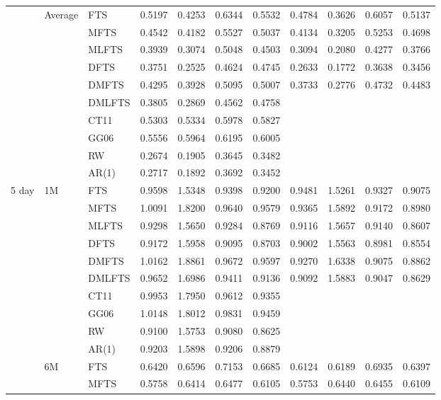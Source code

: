 \documentclass[12pt,a4paper]{article}
\def\textBF#1{\sbox\CBox{#1}\resizebox{\wd\CBox}{\ht\CBox}{\textbf{#1}}}
\begin{document}
\begin{center}
\begin{small}
\begin{longtable}{@{}lllcccccccc@{}}
   \cmidrule{2-11}
   & Average & FTS & 0.5197 & 0.4253 & 0.6344 & 0.5532 & 0.4784 & 0.3626 & 0.6057 & 0.5137 \\ 
  & & MFTS & 0.4542 & 0.4182 & 0.5527 & 0.5037 & 0.4134 & 0.3205 & 0.5253 & 0.4698 \\
  & & MLFTS & 0.3939 & 0.3074 & 0.5048 & 0.4503 & 0.3094 & 0.2080 & 0.4277 & 0.3766\\
  & & DFTS & 0.3751 & 0.2525 & 0.4624 & 0.4745 & 0.2633 & 0.1772 & 0.3638 & 0.3456 \\ 
  & & DMFTS & 0.4295 & 0.3928 & 0.5095 & 0.5007 & 0.3733 & 0.2776 & 0.4732 & 0.4483 \\
  & & DMLFTS & 0.3805 & 0.2869 & 0.4562 & 0.4758 & \textBF{0.2629} & \textBF{0.1768} & \textBF{0.3634} & \textBF{0.3450} \\
  & & CT11 & 0.5303 & 0.5334 & 0.5978 & 0.5827  \\
  & & GG06 & 0.5556 & 0.5964 & 0.6195 & 0.6005 \\
  & & RW & 0.2674 & 0.1905 & 0.3645 & 0.3482 \\
  & & AR(1) & 0.2717 & 0.1892 & 0.3692 & 0.3452 \\
\midrule
5 day & 1M & FTS & 0.9598 & 1.5348 & 0.9398 & 0.9200 & 0.9481 & 1.5261 & 0.9327 & 0.9075 \\ 
  & & MFTS & 1.0091 & 1.8200 & 0.9640 & 0.9579 & 0.9365 & 1.5892 & 0.9172 & 0.8980 \\ 
  & & MLFTS & 0.9298 & 1.5650 & 0.9284 & 0.8769 & 0.9116 & 1.5657 & 0.9140 & 0.8607 \\
  & & DFTS & 0.9172 & 1.5958 & 0.9095 & 0.8703 & 0.9002 & 1.5563 & 0.8981 & 0.8554 \\ 
 & & DMFTS & 1.0162 & 1.8861 & 0.9672 & 0.9597 & 0.9270 & 1.6338 & 0.9075 & 0.8862 \\ 
  & & DMLFTS & 0.9652 & 1.6986 & 0.9411 & 0.9136 & 0.9092 & 1.5883 & 0.9047 & 0.8629 \\
  & & CT11 & 0.9953 & 1.7950 & 0.9612 & 0.9355 \\
  & & GG06 & 1.0148 & 1.8012 & 0.9831 & 0.9459 \\
  & & RW & 0.9100 & 1.5753 & 0.9080 & 0.8625 \\  
  & & AR(1) & 0.9203 & 1.5898 & 0.9206 & 0.8879 \\
   \cmidrule{2-11}
   & 6M & FTS & 0.6420 & 0.6596 & 0.7153 & 0.6685 & 0.6124 & 0.6189 & 0.6935 & 0.6397 \\ 
   & & MFTS & 0.5758 & 0.6414 & 0.6477 & 0.6105 & 0.5753 & 0.6440 & 0.6455 & 0.6109 \\ 

\end{longtable}
\end{small}
\end{center}
\end{document}

